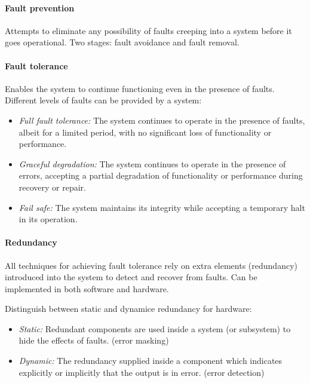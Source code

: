 
\paragraph{Fault prevention} Attempts to eliminate any possibility of faults creeping into a system before it goes operational. Two stages: fault avoidance and fault removal.

\paragraph{Fault tolerance} Enables the system to continue functioning even in the presence of faults. Different levels of faults can be provided by a system:
\begin{itemize}[nolistsep,noitemsep]
  \item \textit{Full fault tolerance:} The system continues to operate in the presence of faults, albeit for a limited period, with no significant loss of functionality or performance.
  \item \textit{Graceful degradation:} The system continues to operate in the presence of errors, accepting a partial degradation of functionality or performance during recovery or repair.
  \item \textit{Fail safe:} The system maintains its integrity while accepting a temporary halt in its operation.
\end{itemize}

\paragraph{Redundancy} All techniques for achieving fault tolerance rely on extra elements (redundancy) introduced into the system to detect and recover from faults. Can be implemented in both software and hardware.

Distinguish between static and dynamice redundancy for hardware:
\begin{itemize}[nolistsep,noitemsep]
  \item \textit{Static:} Redundant components are used inside a system (or subsystem) to hide the effects of faults. (error masking)
  \item \textit{Dynamic:} The redundancy supplied inside a component which indicates explicitly or implicitly that the output is in error. (error detection)
\end{itemize}


